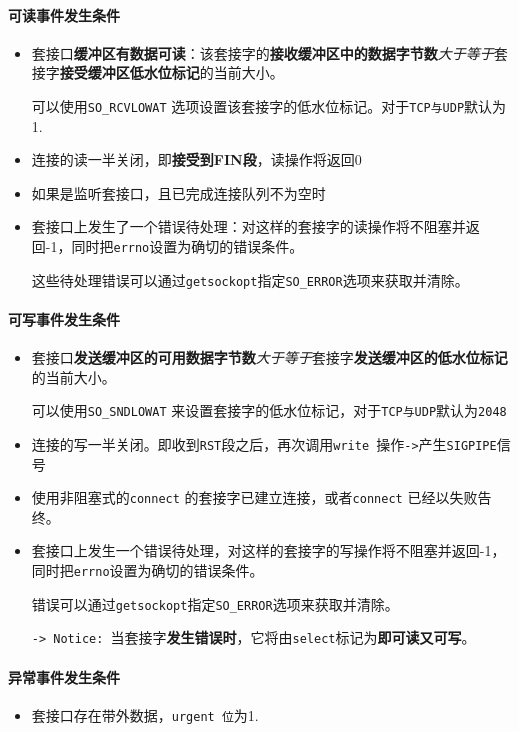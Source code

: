 \documentclass[UTF8,a4paper,12pt]{ctexbook}
\begin{document}
			\paragraph{可读事件发生条件}
				\begin{itemize}
					\item 套接口\textbf{缓冲区有数据可读}：该套接字的\textbf{接收缓冲区中的数据字节数}\textit{大于等于}套接字\textbf{接受缓冲区低水位标记}的当前大小。
					
						可以使用\verb|SO_RCVLOWAT| 选项设置该套接字的低水位标记。对于\verb|TCP与UDP|默认为1.
					\item 连接的读一半关闭，即\textbf{接受到FIN段}，读操作将返回0
					\item 如果是监听套接口，且已完成连接队列不为空时
					\item 套接口上发生了一个错误待处理：对这样的套接字的读操作将不阻塞并返回-1，同时把\verb|errno|设置为确切的错误条件。
					
					这些待处理错误可以通过\verb|getsockopt|指定\verb|SO_ERROR|选项来获取并清除。
				\end{itemize}
			\paragraph{可写事件发生条件}
				\begin{itemize}
					\item 套接口\textbf{发送缓冲区的可用数据字节数}\textit{大于等于}套接字\textbf{发送缓冲区的低水位标记}的当前大小。
					
						可以使用\verb|SO_SNDLOWAT| 来设置套接字的低水位标记，对于\verb|TCP与UDP|默认为\verb|2048|
					\item 连接的写一半关闭。即收到\verb|RST|段之后，再次调用\verb|write |操作\verb|->|产生\verb|SIGPIPE|信号
					\item 使用非阻塞式的\verb|connect| 的套接字已建立连接，或者\verb|connect| 已经以失败告终。
					
					\item 套接口上发生一个错误待处理，对这样的套接字的写操作将不阻塞并返回-1，同时把\verb|errno|设置为确切的错误条件。
					
					错误可以通过\verb|getsockopt|指定\verb|SO_ERROR|选项来获取并清除。
					
					\verb|-> Notice: |当套接字\textbf{发生错误时}，它将由\verb|select|标记为\textbf{即可读又可写}。
				\end{itemize}
			\paragraph{异常事件发生条件}
				\begin{itemize}
					\item 套接口存在带外数据，\verb|urgent 位|为1.
				\end{itemize}
			
\end{document}
